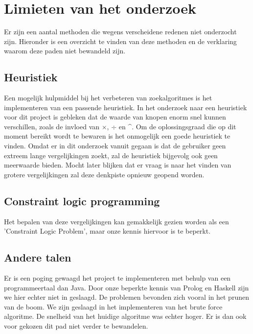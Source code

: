 \documentclass[Main.tex]{subfiles}
\begin{document}
\section{Limieten van het onderzoek}

Er zijn een aantal methoden die wegens verscheidene redenen niet onderzocht zijn. Hieronder is een overzicht te vinden van deze methoden en de verklaring waarom deze paden niet bewandeld zijn. 

\subsection{Heuristiek}
Een mogelijk hulpmiddel bij het verbeteren van zoekalgoritmes is het implementeren van een passende heuristiek. In het onderzoek naar een heuristiek voor dit project is gebleken dat de waarde van knopen enorm snel kunnen verschillen, zoals de invloed van $\times$, $\div$ en \^{}. Om de oplossingsgraad die op dit moment bereikt wordt te bewaren is het onmogelijk een goede heuristiek te vinden. Omdat er in dit onderzoek vanuit gegaan is dat de gebruiker geen extreem lange vergelijkingen zoekt, zal de heuristiek bijgevolg ook geen meerwaarde bieden. Mocht later blijken dat er vraag is naar het vinden van grotere vergelijkingen zal deze denkpiste opnieuw geopend worden.

\subsection{Constraint logic programming}
Het bepalen van deze vergelijkingen kan gemakkelijk gezien worden als een 'Constraint Logic Problem', maar onze kennis hiervoor is te beperkt.

\subsection{Andere talen}
Er is een poging gewaagd het project te implementeren met behulp van een programmeertaal dan Java. Door onze beperkte kennis van Prolog en Haskell zijn we hier echter niet in geslaagd. De problemen bevonden zich vooral in het prunen van de boom. We zijn geslaagd in het implementeren van het brute force algoritme. De snelheid van het huidige algoritme was echter hoger. Er is dan ook voor gekozen dit pad niet verder te bewandelen.
\end{document}
